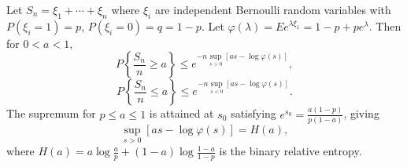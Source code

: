 Let $S_n = \xi_1 + \cdots + \xi_n$ where $\xi_i$ are independent Bernoulli random variables with $P(\xi_i = 1) = p$, $P(\xi_i = 0) = q = 1-p$. Let $\varphi(\lambda) = E e^{\lambda \xi_1} = 1 - p + p e^{\lambda}$. Then for $0 < a < 1$,
$$
P\left\{\frac{S_n}{n} \geq a\right\} \leq e^{-n \sup_{s > 0}[as - \log \varphi(s)]}, \tag{36}
$$
$$
P\left\{\frac{S_n}{n} \leq a\right\} \leq e^{-n \sup_{s < 0}[as - \log \varphi(s)]}. \tag{37}
$$
The supremum for $p \leq a \leq 1$ is attained at $s_0$ satisfying $e^{s_0} = \frac{a(1-p)}{p(1-a)}$, giving
$$
\sup_{s > 0}[as - \log \varphi(s)] = H(a),
$$
where $H(a) = a \log\frac{a}{p} + (1-a) \log\frac{1-a}{1-p}$ is the binary relative entropy.
